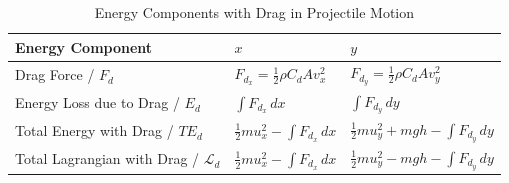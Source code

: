 \documentclass[a4paper, 12pt]{report}
\begin{document}
        \begin{table}[H]
            \centering
            \begin{tabular}{|>{\centering\arraybackslash}p{}|>{\centering\arraybackslash}p{}|>{\centering\arraybackslash}p{}|}
                \hline
                Energy Component & $x$ & $y$ \\ \hline
                Drag Force / $F_d$ & $F_{d_x} = \frac{1}{2} \rho C_d A v_x^2$ & $F_{d_y} = \frac{1}{2} \rho C_d A v_y^2$ \\ \hline
                Energy Loss due to Drag / $E_d$ & $\int F_{d_x} \, dx$ & $\int F_{d_y} \, dy$ \\ \hline
                Total Energy with Drag / $TE_d$ & $\frac{1}{2}m u_x^2 - \int F_{d_x} \, dx$ & $\frac{1}{2}m u_y^2 + mgh - \int F_{d_y} \, dy$ \\ \hline
                Total Lagrangian with Drag / $\mathscr{L}_d$ & $\frac{1}{2}m u_x^2 - \int F_{d_x} \, dx$ & $\frac{1}{2}m u_y^2 - mgh - \int F_{d_y} \, dy$ \\ \hline
            \end{tabular}
            \caption{Energy Components with Drag in Projectile Motion}
            \label{tab:drag_energy}
        \end{table}
  
\end{document}
